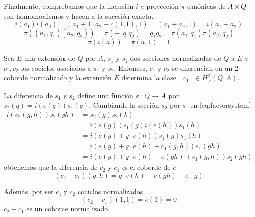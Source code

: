 \begin{proposicion}
\begin{demostracion}
	Finalmente, comprobamos que la inclusión $i$ y proyección $\pi$ canónicas de $A\times Q$ son homomorfismos y hacen a la sucesión exacta.
	\begin{equation*}
		i(a_1)i(a_2)=(a_1 + 1 \cdot a_2+c(1,1),1) = (a_1+a_2,1)=i(a_1+a_2)
	\end{equation*}
	\begin{equation*}
		\pi((a_1,q_1)(a_2,q_2))=\pi(-,q_1q_2) = q_1q_2 = \pi(a_1,q_1)\pi(a_2,q_2)
	\end{equation*}
	\begin{equation*}
		\pi(i(a)) = \pi(a,1) = 1
	\end{equation*}
	\end{demostracion}
\end{proposicion}

\begin{proposicion}\label{prop:res2}
	Sea $E$ una extensión de $Q$ por $A$, $s_1$ y $s_2$ dos secciones normalizadas de $Q$ a $E$ y $c_1,c_2$ los cociclos asociados a $s_1$ y $s_2$. Entonces, $c_1$ y $c_2$ se diferencian en un $2$-coborde normalizado y la extensión $E$ determina la clase $[c_1]\in H_\varphi^2(Q,A)$. 
	
	\begin{demostracion}
		La diferencia de $s_1$ y $s_2$ define una función $e\colon Q\to A$ por $s_2(q) = i(e(q))s_1(q)$. Cambiando la sección $s_2$ por $s_1$ en \eqref{eq:factorsystem}
		\begin{align*}
			i(c_2(g,h))s_2(gh) 
			&= s_2(g)s_2(h) \\ 
			&= i(e(g))s_1(g)i(e(h))s_1(h)\\ 
			&= i(e(g) + g \cdot e(h)) s_1(g)s_1(h) \\ 
			&= i(e(g) + g \cdot e(h) + c_1(g,h))s_1(gh) \\
			&= i(e(g) + g \cdot e(h) - e(gh) + c_1(g,h))s_2(gh)
		\end{align*}
		obtenemos que la diferencia de $c_2$ y $c_1$ es el coborde de $e$
		\begin{equation} 
			(c_2-c_1)(g,h) = g \cdot e(h) - e(gh) + e(g)
		\end{equation}
		
		Además, por ser $c_1$ y $c_2$ cociclos normalizados
		\begin{equation*}
			(c_2-c_1)(1,1) = e(1) = 0
		\end{equation*}
		$c_2-c_1$ es un coborde normalizado.
	\end{demostracion}
\end{proposicion}

